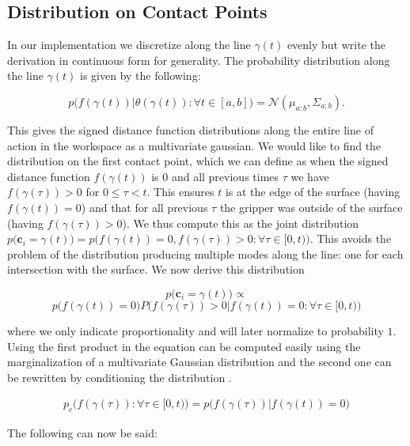 \documentclass[letterpaper, 10 pt, conference]{ieeeconf}  %
\newcommand{\mN}{\mathcal{N}}
\begin{document}
\subsection{Distribution on Contact Points} 
In our implementation we discretize along the line $\gamma(t)$ evenly but write the derivation in continuous form for generality.
The probability distribution along the line $\gamma(t)$ is given by the following:

\begin{equation}
p\big(f(\gamma(t))|\theta(\gamma(t)): \forall t \in [a,b] \big) 
=
\mN(\mu_{a:b},\Sigma_{a:b}).
\end{equation}

This gives the signed distance function distributions along the entire line of action in the workspace as a multivariate gaussian.
We would like to find the distribution on the first contact point, which we can define as when the signed distance function $f(\gamma(t))$ is $0$ and all previous times $\tau$ we have $f(\gamma(\tau)) > 0$ for $0 \leq \tau < t$.
This ensures $t$ is at the edge of the surface (having $f(\gamma(t)) = 0$) and that for all previous $\tau$ the gripper was outside of the surface (having $f(\gamma(\tau)) > 0$).
We thus compute this as the joint distribution $p\big(\textbf{c}_i= \gamma(t)\big) = p\big(f(\gamma(t))=0, f(\gamma(\tau))> 0: \forall \tau \in [0,t)\big)$.
This avoids the problem of the distribution producing multiple modes along the line: one for each intersection with the surface.
We now derive this distribution 

\[
  p\big(\textbf{c}_i = \gamma(t)\big) \propto 
\]
\[
  p\big(f(\gamma(t)) = 0\big)P\big(f(\gamma(\tau)) > 0 | f(\gamma(t)) = 0: \forall \tau \in [0,t)\big)
\]

where we only indicate proportionality and will later normalize to probability $1$.
Using the first product in the equation can be computed easily using the marginalization of a multivariate Gaussian distribution and the second one can be rewritten by conditioning the distribution \cite{petersen2008matrix}. 

\begin{align*}
p_c\big(f(\gamma(\tau)): \forall \tau \in [0,t)\big) = p\big(f(\gamma(\tau))  | f(\gamma(t)) = 0\big)  
\end{align*}


The following can now be said:
\end{document}

